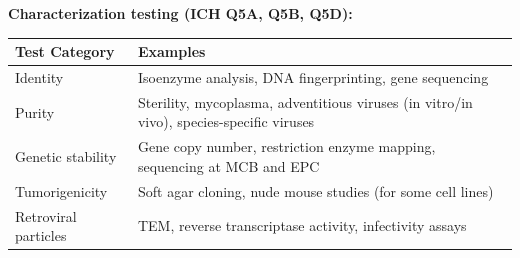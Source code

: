 \documentclass[
  11pt,
  a4paper,
]{report}
\begin{document}
\textbf{Characterization testing (ICH Q5A, Q5B, Q5D):}

\begin{longtable}[]{@{}ll@{}}
\toprule
\begin{minipage}[b]{0.57\columnwidth}\raggedright
Test Category\strut
\end{minipage} & \begin{minipage}[b]{0.37\columnwidth}\raggedright
Examples\strut
\end{minipage}\tabularnewline
\midrule
\endhead
\begin{minipage}[t]{0.57\columnwidth}\raggedright
Identity\strut
\end{minipage} & \begin{minipage}[t]{0.37\columnwidth}\raggedright
Isoenzyme analysis, DNA fingerprinting, gene sequencing\strut
\end{minipage}\tabularnewline
\begin{minipage}[t]{0.57\columnwidth}\raggedright
Purity\strut
\end{minipage} & \begin{minipage}[t]{0.37\columnwidth}\raggedright
Sterility, mycoplasma, adventitious viruses (in vitro/in vivo),
species-specific viruses\strut
\end{minipage}\tabularnewline
\begin{minipage}[t]{0.57\columnwidth}\raggedright
Genetic stability\strut
\end{minipage} & \begin{minipage}[t]{0.37\columnwidth}\raggedright
Gene copy number, restriction enzyme mapping, sequencing at MCB and
EPC\strut
\end{minipage}\tabularnewline
\begin{minipage}[t]{0.57\columnwidth}\raggedright
Tumorigenicity\strut
\end{minipage} & \begin{minipage}[t]{0.37\columnwidth}\raggedright
Soft agar cloning, nude mouse studies (for some cell lines)\strut
\end{minipage}\tabularnewline
\begin{minipage}[t]{0.57\columnwidth}\raggedright
Retroviral particles\strut
\end{minipage} & \begin{minipage}[t]{0.37\columnwidth}\raggedright
TEM, reverse transcriptase activity, infectivity assays\strut
\end{minipage}\tabularnewline
\bottomrule
\end{longtable}
\end{document}
